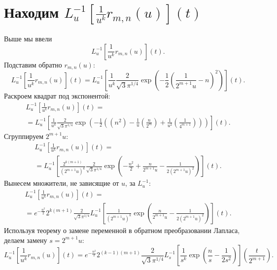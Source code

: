 \documentclass[12pt, a4paper]{report}
\begin{document}
\section{Находим $L^{-1}_u [\frac{1}{u^k} r_{m,n}(u)](t)$}
Выше мы ввели
\[
    L^{-1}_u \left[ \frac{1}{u^k} r_{m,n}(u) \right](t)
.\]
Подставим обратно $r_{m,n}(u)$:
\[
    L^{-1}_u \left[ \frac{1}{u^k} r_{m,n}(u) \right](t) =
%
    L^{-1}_u \left[ \frac{1}{u^k} \frac{2}{\sqrt{3} \pi^{1/4} } 
    \exp \left( -\frac{1}{2} \left( \frac{1}{2^{m+1}u} - n \right)^2  \right)
    \right](t)
.\]
Раскроем квадрат под экспонентой:
\begin{multline*}
    L^{-1}_u \left[ \frac{1}{u^k} r_{m,n}(u) \right](t)
=\\=%
    L^{-1}_u \left[ \frac{1}{u^k} \frac{2}{\sqrt{3} \pi^{1/4} } 
    \exp \left( -\frac{1}{2}
    \left(\left( n^2 \right) - \frac{1}{u} \left(\frac{n}{2^m}\right) + \frac{1}{u^2} \left(\frac{1}{4^{m+1}}\right)\right)
    \right)
    \right](t)
.\end{multline*}
Сгруппируем $2^{m+1}u$:
\begin{multline*}
    L^{-1}_u \left[ \frac{1}{u^k} r_{m,n}(u) \right](t)
=\\=%
    L^{-1}_u \left[ \frac{2^{k(m+1)}}{\left(2^{m+1}u\right)^k} \frac{2}{\sqrt{3} \pi^{1/4} } 
    \exp \left( -\frac{n^2}{2} + \frac{n}{2^{m+1}u} - \frac{1}{2 \left( 2^{m+1}u \right)^2 }
    \right)
    \right](t)
.\end{multline*}
Вынесем множители, не зависящие от $u$, за $L^{-1}_u$:
\begin{multline*}
    L^{-1}_u \left[ \frac{1}{u^k} r_{m,n}(u) \right](t)
=\\=
    e^{-\frac{n^2}{2}} 2^{k(m+1)} \frac{2}{\sqrt{3} \pi^{1/4}}
    L^{-1}_u \left[ \frac{1}{\left(2^{m+1}u\right)^k}
    \exp \left(\frac{n}{2^{m+1}u} - \frac{1}{2 \left( 2^{m+1}u \right)^2 }
    \right)
    \right](t)
.\end{multline*}
Используя теорему о замене переменной в обратном преобразовании Лапласа, делаем замену $s=2^{m+1}u$:
\[
    L^{-1}_u \left[ \frac{1}{u^k} r_{m,n}(u) \right](t) =
%
    e^{-\frac{n^2}{2}} 2^{(k-1)(m+1)} \frac{2}{\sqrt{3} \pi^{1/4}}
    L^{-1}_s \left[ \frac{1}{s^k}
    \exp \left(\frac{n}{s} - \frac{1}{2 s^2 }
    \right)
    \right] \left( \frac{t}{2^{m+1}} \right)
.\]
\end{document}
